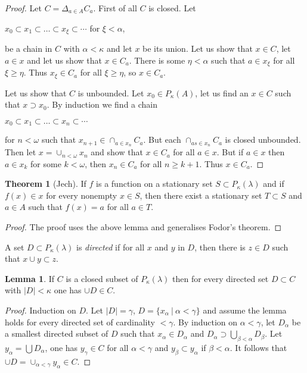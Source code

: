 \documentclass[8pt]{article}
\theoremstyle{definition}
\theoremstyle{definition}
\newtheorem{theorem}{Theorem}[section]
\theoremstyle{definition}
\theoremstyle{definition}
\theoremstyle{definition}
\theoremstyle{definition}
\theoremstyle{definition}
\theoremstyle{definition}
\newtheorem{lemma}{Lemma}[section]
\theoremstyle{definition}
\theoremstyle{definition}
\theoremstyle{definition}
\theoremstyle{definition}
\theoremstyle{definition}
\theoremstyle{definition}
\theoremstyle{question}
\begin{document}
\begin{proof}
Let $C = \Delta_{a \in A} C_a$. First of all $C$ is closed. Let
\begin{center}
  $x_0 \subset x_1 \subset \ldots \subset x_{\xi} \subset \cdots$ for $\xi < \alpha$,
\end{center}
be a chain in $C$ with $\alpha < \kappa$ and let $x$ be its union.
Let us show that $x \in C$, let $a \in x$ and let us show that $x \in C_a$. 
There is some $\eta < \alpha$ such that $a \in x_{\xi}$ for all $\xi \geq \eta$.
Thus $x_{\xi} \in C_a$ for all $\xi \geq \eta$, so $x \in C_a$.

Let us show that $C$ is unbounded. Let $x_0 \in P_{\kappa}(A)$, let us find an $x \in C$
such that $x \supset x_0$. By induction we find a chain
\begin{center}
  $x_0 \subset x_1 \subset \ldots \subset x_n \subset \cdots$
\end{center}
for $n < \omega$ such that $x_{n + 1} \in \cap_{a \in x_n} C_a$. But each 
$\cap_{as \in x_n} C_a$ is closed unbounded. 
Then let $x = \cup_{n < \omega} x_n$ and show that $x \in C_a$ for all $a \in x$. But if $a \in x$ then 
$a \in x_k$ for some $k < \omega$, then $x_n \in C_a$ for all $n \geq k + 1$. Thus $x \in C_a$.
\end{proof}

\begin{theorem}[Jech]
If $f$ is a function on a stationary set $S \subset P_{\kappa}(\lambda)$ and if 
$f(x) \in x$ for every nonempty $x \in S$, then there exist a stationary set $T \subset S$
and $a \in A$ such that $f(x) = a$ for all $a \in T$.
\end{theorem}

\begin{proof}
  The proof uses the above lemma and generalises Fodor's theorem.
\end{proof}

A set $D \subset P_{\kappa}(\lambda)$ is \emph{directed} if for all $x$ and $y$ in $D$, then there is $z \in D$
such that $x \cup y \subset z$.

\begin{lemma}
  If $C$ is a closed subset of $P_{\kappa}(\lambda)$ then for every directed set $D \subset C$ with
  $|D| < \kappa$ one has $\cup D \in C$.
\end{lemma}

\begin{proof}
  Induction on $D$. Let $|D| = \gamma$, $D = \{ x_{\alpha} \: | \: \alpha < \gamma \}$ and 
  assume the lemma holds for every directed set of cardinality $< \gamma$. 
  By induction on $\alpha < \gamma$, let $D_{\alpha}$ be a smallest directed subset of $D$ such that
  $x_{\alpha} \in D_{\alpha}$ and $D_{\alpha} \supset \bigcup \limits_{\beta < \alpha} D_{\beta}$.
  Let $y_{\alpha} = \bigcup D_{\alpha}$, one has $y_{\gamma} \in C$ 
  for all $\alpha < \gamma$ and $y_{\beta} \subset y_{\alpha}$ if $\beta < \alpha$.
  It follows that $\cup D = \cup_{\alpha < \gamma} y_{\alpha} \in C$.
\end{proof}
\end{document}

